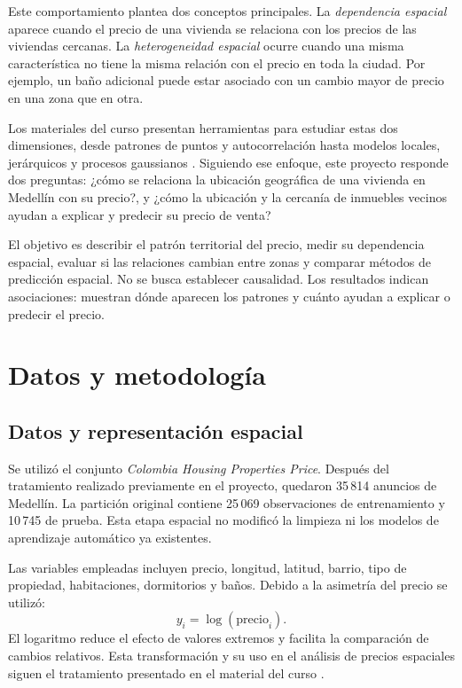 \documentclass[conference]{IEEEtran}
\begin{document}
Este comportamiento plantea dos conceptos principales. La \emph{dependencia espacial} aparece cuando el precio de una vivienda se relaciona con los precios de las viviendas cercanas. La \emph{heterogeneidad espacial} ocurre cuando una misma característica no tiene la misma relación con el precio en toda la ciudad. Por ejemplo, un baño adicional puede estar asociado con un cambio mayor de precio en una zona que en otra.

Los materiales del curso presentan herramientas para estudiar estas dos dimensiones, desde patrones de puntos y autocorrelación hasta modelos locales, jerárquicos y procesos gaussianos \cite{materialcurso,librocurso}. Siguiendo ese enfoque, este proyecto responde dos preguntas: ¿cómo se relaciona la ubicación geográfica de una vivienda en Medellín con su precio?, y ¿cómo la ubicación y la cercanía de inmuebles vecinos ayudan a explicar y predecir su precio de venta?

El objetivo es describir el patrón territorial del precio, medir su dependencia espacial, evaluar si las relaciones cambian entre zonas y comparar métodos de predicción espacial. No se busca establecer causalidad. Los resultados indican asociaciones: muestran dónde aparecen los patrones y cuánto ayudan a explicar o predecir el precio.

\section{Datos y metodología}

\subsection{Datos y representación espacial}

Se utilizó el conjunto \emph{Colombia Housing Properties Price}. Después del tratamiento realizado previamente en el proyecto, quedaron 35\,814 anuncios de Medellín. La partición original contiene 25\,069 observaciones de entrenamiento y 10\,745 de prueba. Esta etapa espacial no modificó la limpieza ni los modelos de aprendizaje automático ya existentes.

Las variables empleadas incluyen precio, longitud, latitud, barrio, tipo de propiedad, habitaciones, dormitorios y baños. Debido a la asimetría del precio se utilizó:
\begin{equation*}
    y_i=\log(\text{precio}_i).
\end{equation*}
El logaritmo reduce el efecto de valores extremos y facilita la comparación de cambios relativos.
Esta transformación y su uso en el análisis de precios espaciales siguen el tratamiento presentado en el material del curso \cite{materialcurso}.
\end{document}
